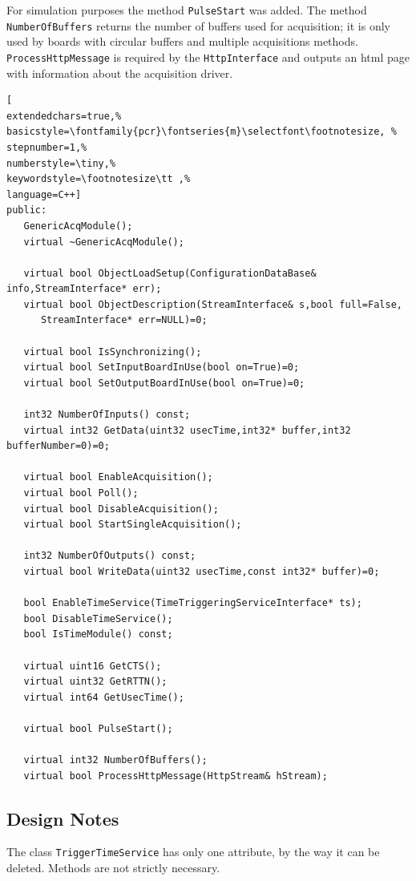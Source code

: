 For simulation purposes the method \texttt{PulseStart} was added. The method \texttt{NumberOfBuffers} returns the number of buffers used for acquisition; it is only used by boards with circular buffers and multiple acquisitions methods. \texttt{ProcessHttpMessage} is required by the \texttt{HttpInterface} and outputs an html page with information about the acquisition driver.

\begin{lstlisting}[
extendedchars=true,%
basicstyle=\fontfamily{pcr}\fontseries{m}\selectfont\footnotesize, %
stepnumber=1,%
numberstyle=\tiny,%
keywordstyle=\footnotesize\tt ,%
language=C++]
public:
   GenericAcqModule();
   virtual ~GenericAcqModule();

   virtual bool ObjectLoadSetup(ConfigurationDataBase& info,StreamInterface* err);
   virtual bool ObjectDescription(StreamInterface& s,bool full=False,
      StreamInterface* err=NULL)=0;

   virtual bool IsSynchronizing();
   virtual bool SetInputBoardInUse(bool on=True)=0;
   virtual bool SetOutputBoardInUse(bool on=True)=0;

   int32 NumberOfInputs() const;
   virtual int32 GetData(uint32 usecTime,int32* buffer,int32 bufferNumber=0)=0;

   virtual bool EnableAcquisition();
   virtual bool Poll();
   virtual bool DisableAcquisition();
   virtual bool StartSingleAcquisition();

   int32 NumberOfOutputs() const;
   virtual bool WriteData(uint32 usecTime,const int32* buffer)=0;

   bool EnableTimeService(TimeTriggeringServiceInterface* ts);
   bool DisableTimeService();
   bool IsTimeModule() const;

   virtual uint16 GetCTS();
   virtual uint32 GetRTTN();
   virtual int64 GetUsecTime();

   virtual bool PulseStart();

   virtual int32 NumberOfBuffers();
   virtual bool ProcessHttpMessage(HttpStream& hStream);
\end{lstlisting}



\subsection{Design Notes}
The class \texttt{TriggerTimeService} has only one attribute, by the way it can be deleted. Methods are not strictly necessary.



